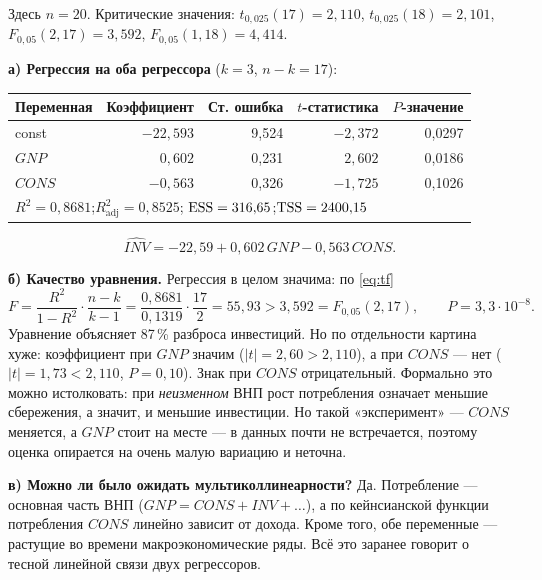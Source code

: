 \begin{solution}
Здесь $n = 20$. Критические значения: $t_{0{,}025}(17) = 2{,}110$,
$t_{0{,}025}(18) = 2{,}101$, $F_{0{,}05}(2, 17) = 3{,}592$,
$F_{0{,}05}(1, 18) = 4{,}414$.

\medskip
\textbf{а) Регрессия на оба регрессора} ($k = 3$, $n - k = 17$):
\begin{center}
\begin{tabular}{lrrrr}
\toprule
Переменная & Коэффициент & Ст. ошибка & $t$-статистика & $P$-значение \\
\midrule
const           & $-22{,}593$ & 9,524 & $-2{,}372$ & 0,0297 \\
$\mathit{GNP}$  & $\phantom{-}0{,}602$ & 0,231 & $\phantom{-}2{,}602$ & 0,0186 \\
$\mathit{CONS}$ & $-0{,}563$ & 0,326 & $-1{,}725$ & 0,1026 \\
\midrule
\multicolumn{5}{l}{$R^2 = 0{,}8681$;\quad $R^2_{\text{adj}} = 0{,}8525$;\quad
  $\mathrm{ESS} = 316{,}65$;\quad $\mathrm{TSS} = 2400{,}15$} \\
\bottomrule
\end{tabular}
\end{center}
\[
  \widehat{\mathit{INV}} = -22{,}59 + 0{,}602\,\mathit{GNP} - 0{,}563\,\mathit{CONS}.
\]

\medskip
\textbf{б) Качество уравнения.} Регрессия в целом значима: по \eqref{eq:tf}
\[
  F = \frac{R^2}{1-R^2}\cdot\frac{n-k}{k-1}
    = \frac{0{,}8681}{0{,}1319}\cdot\frac{17}{2}
    = 55{,}93 > 3{,}592 = F_{0{,}05}(2, 17),
  \qquad P = 3{,}3\cdot 10^{-8}.
\]
Уравнение объясняет 87\,\% разброса инвестиций. Но по отдельности картина
хуже: коэффициент при $\mathit{GNP}$ значим ($|t| = 2{,}60 > 2{,}110$), а при
$\mathit{CONS}$ — нет ($|t| = 1{,}73 < 2{,}110$, $P = 0{,}10$). Знак при
$\mathit{CONS}$ отрицательный. Формально это можно истолковать: при
\emph{неизменном} ВНП рост потребления означает меньшие сбережения, а значит,
и меньшие инвестиции. Но такой «эксперимент» — $\mathit{CONS}$ меняется, а
$\mathit{GNP}$ стоит на месте — в данных почти не встречается, поэтому оценка
опирается на очень малую вариацию и неточна.

\medskip
\textbf{в) Можно ли было ожидать мультиколлинеарности?} Да. Потребление —
основная часть ВНП ($\mathit{GNP} = \mathit{CONS} + \mathit{INV} + \dots$), а
по кейнсианской функции потребления $\mathit{CONS}$ линейно зависит от дохода.
Кроме того, обе переменные — растущие во времени макроэкономические ряды. Всё
это заранее говорит о тесной линейной связи двух регрессоров.


\end{solution}
